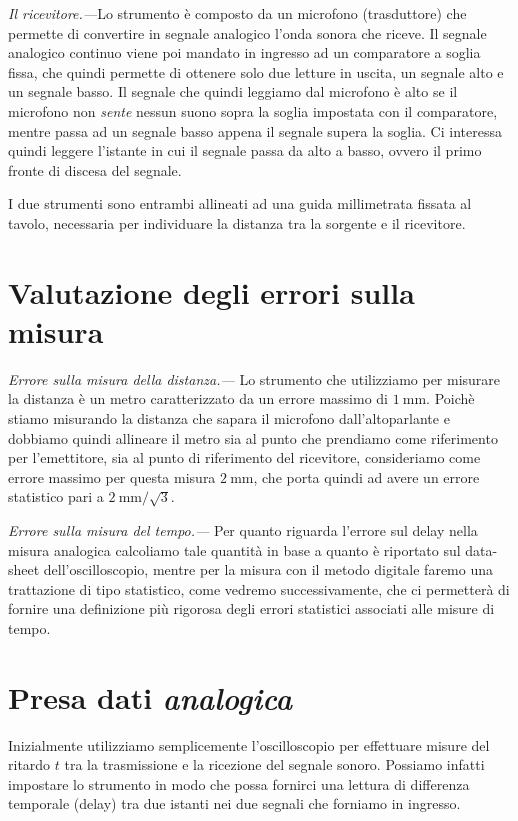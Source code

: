 \documentclass[
    rmp,
    reprint, 
    superscriptaddress, 
    altaffilletter, 
    amsmath, 
    amssymb, 
    a4paper,
    varvw]{revtex4-2}
\begin{document}
\textit{Il ricevitore.---}Lo strumento è composto da un microfono (trasduttore) che permette di convertire in segnale analogico l'onda sonora che riceve. Il segnale analogico continuo viene poi mandato in ingresso ad un comparatore a soglia fissa\iffalse(automaticamente impostata ad un valore di \SI{00}{\volt})\fi, che quindi permette di ottenere solo due letture in uscita, un segnale alto e un segnale basso. Il segnale che quindi leggiamo dal microfono è alto se il microfono non \emph{sente} nessun suono sopra la soglia impostata con il comparatore, mentre passa ad un segnale basso appena il segnale supera la soglia. Ci interessa quindi leggere l'istante in cui il segnale passa da alto a basso, ovvero il primo fronte di discesa del segnale. 

I due strumenti sono entrambi allineati ad una guida millimetrata fissata al tavolo, necessaria per individuare la distanza tra la sorgente e il ricevitore. 

\section{Valutazione degli errori sulla misura}
\textit{Errore sulla misura della distanza.---} Lo strumento che utilizziamo per misurare la distanza è un metro caratterizzato da un errore massimo di $\SI{1}{\milli\metre}$. Poichè stiamo misurando la distanza che sapara il microfono dall'altoparlante e dobbiamo quindi allineare il metro sia al punto che prendiamo come riferimento per l'emettitore, sia al punto di riferimento del ricevitore, consideriamo come errore massimo per questa misura $\SI{2}{\milli\metre}$, che porta quindi ad avere un errore statistico pari a $\SI{2}{\milli\metre}/\sqrt{3}$.

\textit{Errore sulla misura del tempo.---} Per quanto riguarda l'errore sul delay nella misura analogica calcoliamo tale quantità in base a quanto è riportato sul data-sheet dell'oscilloscopio, mentre per la misura con il metodo digitale faremo una trattazione di tipo statistico, come vedremo successivamente, che ci permetterà di fornire una definizione più rigorosa degli errori statistici associati alle misure di tempo.


\section{Presa dati \emph{analogica}}

Inizialmente utilizziamo semplicemente l'oscilloscopio per effettuare misure del ritardo $t$ tra la trasmissione e la ricezione del segnale sonoro. Possiamo infatti impostare lo strumento in modo che possa fornirci una lettura di differenza temporale (delay) tra due istanti nei due segnali che forniamo in ingresso. 
\end{document}
